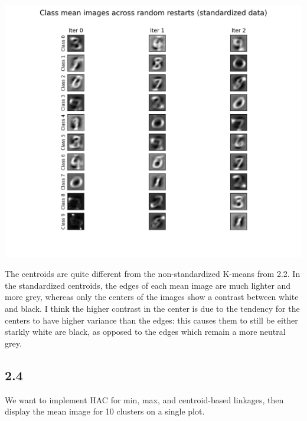 \documentclass[submit]{harvardml}
\begin{document}
\includegraphics[scale=0.5]{plots/kmeans-standardized.png}

The centroids are quite different from the non-standardized K-means from 2.2. In the standardized centroids, the edges of each mean image are much lighter and more grey, whereas only the centers of the images show a contrast between white and black. I think the higher contrast in the center is due to the tendency for the centers to have higher variance than the edges: this causes them to still be either starkly white are black, as opposed to the edges which remain a more neutral grey.

\newpage
\subsection*{2.4}
We want to implement HAC for min, max, and centroid-based linkages, then display the mean image for 10 clusters on a single plot.
\end{document}
